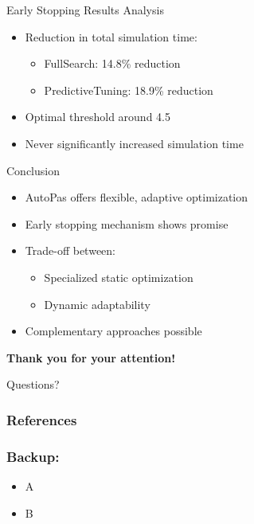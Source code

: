 \documentclass[
	10pt,
	t		%
]{beamer}
\begin{document}
\begin{frame}{Early Stopping Results Analysis}

    \begin{itemize}
        \item Reduction in total simulation time:
              \begin{itemize}
                  \item FullSearch: 14.8\% reduction
                  \item PredictiveTuning: 18.9\% reduction
              \end{itemize}
        \item Optimal threshold around 4.5
        \item Never significantly increased simulation time
    \end{itemize}
\end{frame}


\begin{frame}{Conclusion}
    \begin{itemize}
        \item AutoPas offers flexible, adaptive optimization
        \item Early stopping mechanism shows promise
        \item Trade-off between:
              \begin{itemize}
                  \item Specialized static optimization
                  \item Dynamic adaptability
              \end{itemize}
        \item Complementary approaches possible
    \end{itemize}
\end{frame}



\begin{frame}
    \begin{center}
        \vspace{1cm}
        {\large \textbf{Thank you for your attention!}}

        \vspace{2cm}

        \Huge{Questions?}
    \end{center}
\end{frame}




\begin{frame}
    \frametitle{References}
    \footnotesize
    
    
\end{frame}

\appendix

\begin{frame}
    \frametitle{Backup:}

    \begin{itemize}
        \item A
        \item B
    \end{itemize}
\end{frame}
\end{document}

